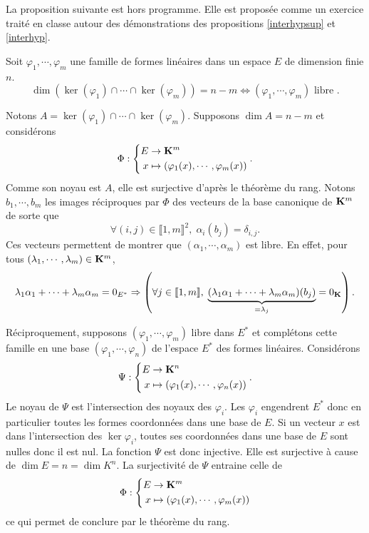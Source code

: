 La proposition suivante est hors programme. Elle est proposée comme un exercice traité en classe autour des démonstrations des propositions \ref{interhypsup} et \ref{interhyp}.
\begin{propn}
Soit $\varphi_1,\cdots, \varphi_m$ une famille de formes linéaires dans un espace $E$ de dimension finie $n$.
\begin{displaymath}
  \dim \left( \ker(\varphi_1)\cap \cdots \cap \ker(\varphi_m)\right) = n - m
\Leftrightarrow (\varphi_1,\cdots,\varphi_m)\text{ libre }.
\end{displaymath} 
\end{propn}
\begin{demo}
Notons $A=\ker(\varphi_1)\cap \cdots \cap \ker(\varphi_m)$.\newline
Supposons $\dim A = n-m$ et considérons 
\[
  \Phi:
\left\lbrace 
\begin{aligned}
  E &\rightarrow \mathbf{K}^m \\ x&\mapsto (\varphi_1(x),\cdots,\varphi_m(x))
\end{aligned}
\right. .  
\]
Comme son noyau est $A$, elle est surjective d'après le théorème du rang. Notons $b_1, \cdots, b_m$ les images réciproques par $\Phi$ des vecteurs de la base canonique de $\mathbf{K}^m$ de sorte que
\[
  \forall (i,j) \in \llbracket 1,m \rrbracket^2,\; \alpha_i(b_j) = \delta_{i,j}.
\]
Ces vecteurs permettent de montrer que $(\alpha_1, \cdots, \alpha_m)$ est libre. En effet, pour tous $(\lambda_1, \cdots, \lambda_m)\in \mathbf{K}^m$,
\[
  \lambda_1 \alpha_1 + \cdots + \lambda_m \alpha_m = 0_{E^*}
  \Rightarrow \left( \forall j \in \llbracket 1, m \rrbracket, \; 
  \underset{= \lambda_j}{\underbrace{(\lambda_1 \alpha_1 + \cdots + \lambda_m \alpha_m)(b_j)}} = 0_{\mathbf{K}}\right).
\]

Réciproquement, supposons $(\varphi_1, \cdots, \varphi_m)$ libre dans $E^*$ et complétons cette famille en une base $(\varphi_1,\cdots,\varphi_n)$ de l'espace $E^*$ des formes linéaires. Considérons
\[
  \Psi:
\left\lbrace 
\begin{aligned}
  E &\rightarrow \mathbf{K}^n \\ x&\mapsto (\varphi_1(x),\cdots,\varphi_n(x))
\end{aligned}
\right. .
\]
Le noyau de $\Psi$ est l'intersection des noyaux des $\varphi_i$. Les $\varphi_i$ engendrent $E^*$ donc en particulier toutes les formes coordonnées dans une base de $E$. Si un vecteur $x$ est dans l'intersection des $\ker \varphi_i$, toutes ses coordonnées dans une base de $E$ sont nulles donc il est nul. La fonction $\Psi$ est donc injective. Elle est surjective à cause de $\dim E = n = \dim K^n$. La surjectivité de $\Psi$ entraine celle de 
\[
  \Phi:
\left\lbrace 
\begin{aligned}
  E &\rightarrow \mathbf{K}^m \\ x&\mapsto (\varphi_1(x),\cdots,\varphi_m(x))
\end{aligned}
\right. 
\]
ce qui permet de conclure par le théorème du rang.
\end{demo}


